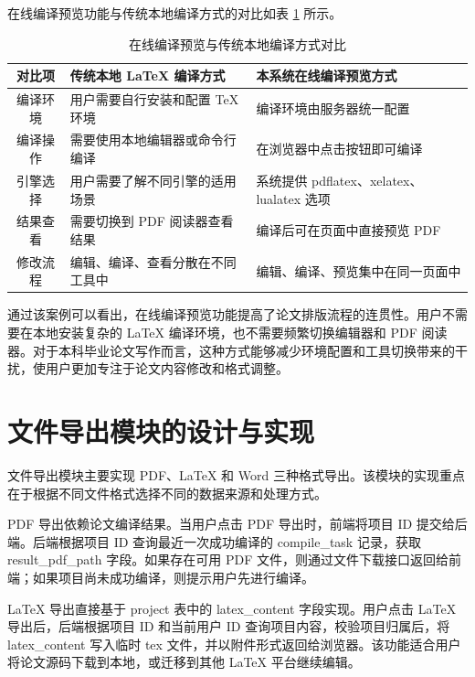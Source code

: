 \documentclass{xduugthesis}
\begin{document}
在线编译预览功能与传统本地编译方式的对比如表 \ref{tab:compile-compare} 所示。

\begin{table}[!ht]
    \centering
    \caption{在线编译预览与传统本地编译方式对比}
    \label{tab:compile-compare}
    \begin{tabular}{|c|p{5cm}|p{5cm}|}
        \hline
        对比项 & 传统本地 LaTeX 编译方式 & 本系统在线编译预览方式 \\
        \hline
        编译环境 & 用户需要自行安装和配置 TeX 环境 & 编译环境由服务器统一配置 \\
        \hline
        编译操作 & 需要使用本地编辑器或命令行编译 & 在浏览器中点击按钮即可编译 \\
        \hline
        引擎选择 & 用户需要了解不同引擎的适用场景 & 系统提供 pdflatex、xelatex、lualatex 选项 \\
        \hline
        结果查看 & 需要切换到 PDF 阅读器查看结果 & 编译后可在页面中直接预览 PDF \\
        \hline
        修改流程 & 编辑、编译、查看分散在不同工具中 & 编辑、编译、预览集中在同一页面中 \\
        \hline
    \end{tabular}
\end{table}

通过该案例可以看出，在线编译预览功能提高了论文排版流程的连贯性。用户不需要在本地安装复杂的 LaTeX 编译环境，也不需要频繁切换编辑器和 PDF 阅读器。对于本科毕业论文写作而言，这种方式能够减少环境配置和工具切换带来的干扰，使用户更加专注于论文内容修改和格式调整。

\section{文件导出模块的设计与实现}
文件导出模块主要实现 PDF、LaTeX 和 Word 三种格式导出。该模块的实现重点在于根据不同文件格式选择不同的数据来源和处理方式\cite{dejean2006pdfxml}。

PDF 导出依赖论文编译结果。当用户点击 PDF 导出时，前端将项目 ID 提交给后端。后端根据项目 ID 查询最近一次成功编译的 compile\_task 记录，获取 result\_pdf\_path 字段。如果存在可用 PDF 文件，则通过文件下载接口返回给前端；如果项目尚未成功编译，则提示用户先进行编译。

LaTeX 导出直接基于 project 表中的 latex\_content 字段实现。用户点击 LaTeX 导出后，后端根据项目 ID 和当前用户 ID 查询项目内容，校验项目归属后，将 latex\_content 写入临时 tex 文件，并以附件形式返回给浏览器。该功能适合用户将论文源码下载到本地，或迁移到其他 LaTeX 平台继续编辑。
\end{document}
